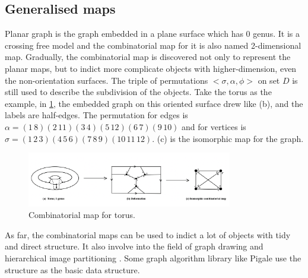 \subsection{Generalised maps}
Planar graph is the graph embedded in a plane surface which has 0 genus. It is a crossing free model and the combinatorial map for it is also named 2-dimensional map. Gradually, the combinatorial map is discovered not only to represent the planar maps, but to indict more complicate objects with higher-dimension, even the non-orientation surfaces. The triple of permutations \(<\sigma,\alpha,\phi>\) on set \(D\) is still used to describe the subdivision of the objects.  Take the torus as the example, in \cref{fig:figures:hdmap}, the embedded graph on this oriented surface drew like (b), and the labels are half-edges. The permutation for edges is  \(\alpha=(1\,8)(2\,11)(3\,4)(5\,12)(6\,7)(9\,10)\) and for vertices is \(\sigma=(1\,2\,3)(4\,5\,6)(7\,8\,9)(10\,11\,12)\). (c) is the isomorphic map for the graph.

\begin{figure}[htb]
  \centering
  \includegraphics[width=0.8\textwidth]{../../image/hdmap.png}
  \caption{Combinatorial map for torus.}
  \label{fig:figures:hdmap}
\end{figure}

As far, the combinatorial maps can be used to indict a lot of objects with tidy and direct structure. It also involve into the field of graph drawing and hierarchical image partitioning \cite{haxhimusa2005hierarchical}. Some graph algorithm library like Pigale \cite{de2002pigale} use the structure as the basic data structure.